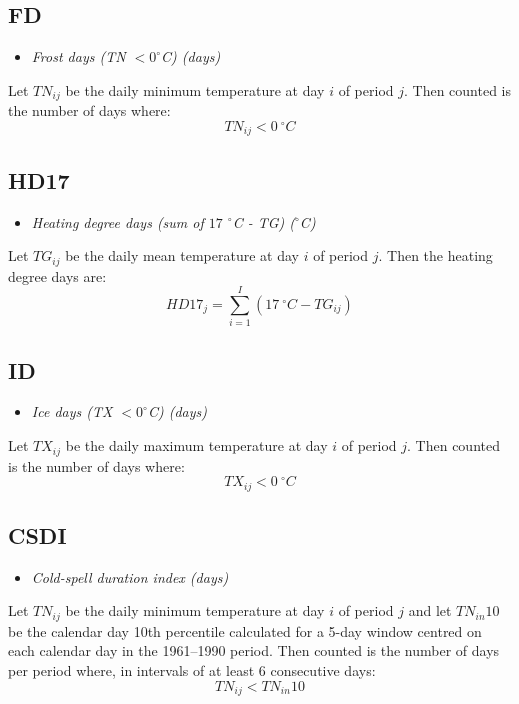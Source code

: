 \documentclass[a4paper,11pt]{article}
\begin{document}
\subsection*{FD}
\begin{itemize}
\item \textit{Frost days (TN $< 0^\circ$C) (days)}
\end{itemize}
Let $TN_{ij}$ be the daily minimum temperature at day $i$ of period
$j$. Then counted is the number of days where:
\begin{equation*}
TN_{ij} < 0 \:^\circ C
\end{equation*}

\subsection*{HD17}
\begin{itemize}
\item \textit{Heating degree days (sum of $17$ $^\circ$C - TG)
($^\circ$C)}
\end{itemize}
Let $TG_{ij}$ be the daily mean temperature at day $i$ of period
$j$. Then the heating degree days are:
\begin{equation*}
HD17_{j} = \sum_{i=1}^{I}(17 \:^\circ C - TG_{ij})
\end{equation*}

\subsection*{ID}
\begin{itemize}
\item \textit{Ice days (TX $< 0^\circ$C) (days)}
\end{itemize}
Let $TX_{ij}$ be the daily maximum temperature at day $i$ of period
$j$. Then counted is the number of days where:
\begin{equation*}
TX_{ij} < 0\: ^\circ C
\end{equation*}


\subsection*{CSDI}
\begin{itemize}
\item \textit{Cold-spell duration index (days)}
\end{itemize}
Let $TN_{ij}$ be the daily minimum temperature at day $i$ of period
$j$ and let $TN_{in}10$ be the calendar day 10th percentile calculated
for a 5-day window centred on each calendar day in the 1961--1990
period. Then counted is the number of days per period where, in
intervals of at least 6 consecutive days:
\begin{equation*}
TN_{ij} < TN_{in}10
\end{equation*}
\end{document}
